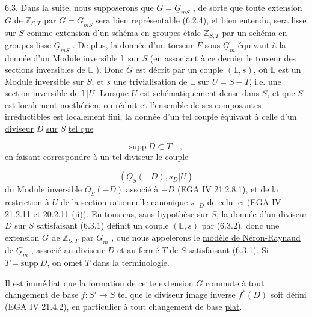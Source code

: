 6.3.  Dans la suite, nous supposerons que $G = \underline{G}_{mS}$ , de sorte que toute extension $\underline{G}$ de $\mathbb{Z}_{S,T}$ par $G = \underline{G}_{mS}$ sera bien représentable (6.2.4), et bien entendu, sera lisse sur $S$ comme extension d'un schéma en groupes étale $\mathbb{Z}_{S,T}$ par un schéma en groupes lisse $\underline{G}_{mS}$ . De plus, la donnée d'un torseur $F$ sous $\underline{G}_m$ équivaut à la donnée d'un Module inversible $\mathbb{L}$ sur $S$ (en associant à ce dernier le torseur des sections inversibles de $\mathbb{L}$ ). Donc $\overline{G}$ est décrit par un couple $(\mathbb{L},s)$, où $\mathbb{L}$ est un Module inversible sur $S$, et $s$ une trivialisation de $\mathbb{L}$ sur $U=S-T$, i.e. une section inversible de $\mathbb{L}|U$. Lorsque $U$ est schématiquement dense dans $S$, et que $S$ est localement noethérien, ou réduit et l'ensemble de ses composantes irréductibles est localement fini, la donnée d'un tel couple équivaut à celle d'un \underline{diviseur} $D$ \underline{sur} $S$ \underline{tel que}

\begin{equation}\tag{6.3.1}
\mathrm{supp}\ D \subset T \quad ,
\end{equation}
en faisant correspondre à un tel diviseur le couple

\begin{equation}\tag{6.3.2}
(\underline{O}_S(-D),s_D|U)
\end{equation}
du Module inversible $\underline{O}_S(-D)$ associé à $-D$ (EGA IV 21.2.8.1), et de la restriction à $U$ de la section rationnelle canonique $s_{-D}$ de celui-ci (EGA IV 21.2.11 et 20.2.11 (ii)). En tous cas, sans hypothèse sur $S$, la donnée d'un diviseur $D$ sur $S$ satisfaisant (6.3.1) définit un couple $(\mathbb{L},s)$ par (6.3.2), donc une extension $G$ de $\mathbb{Z}_{S,T}$ par $\underline{G}_m$ , que nous appelerons le \underline{modèle de Néron-Raynaud de} $\underline{G}_m$ , associé au diviseur $D$ et au fermé $T$ de $S$ satisfaisant (6.3.1). Si $T = \mathrm{supp}\ D$, on omet $T$ dans la terminologie.



Il est immédiat que la formation de cette extension $\overline{G}$ commute à tout changement de base $f : S' \longrightarrow S$ tel que le diviseur image inverse $f^*(D)$ soit défini (EGA IV 21.4.2), en particulier à tout changement de base \underline{plat}.

